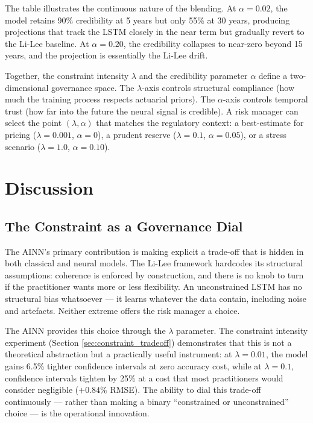 \documentclass[11pt,a4paper]{article}
\begin{document}
The table illustrates the continuous nature of the blending. At $\alpha = 0.02$, the model retains 90\% credibility at 5 years but only 55\% at 30 years, producing projections that track the LSTM closely in the near term but gradually revert to the Li-Lee baseline. At $\alpha = 0.20$, the credibility collapses to near-zero beyond 15 years, and the projection is essentially the Li-Lee drift.

Together, the constraint intensity $\lambda$ and the credibility parameter $\alpha$ define a two-dimensional governance space. The $\lambda$-axis controls structural compliance (how much the training process respects actuarial priors). The $\alpha$-axis controls temporal trust (how far into the future the neural signal is credible). A risk manager can select the point $(\lambda, \alpha)$ that matches the regulatory context: a best-estimate for pricing ($\lambda = 0.001$, $\alpha = 0$), a prudent reserve ($\lambda = 0.1$, $\alpha = 0.05$), or a stress scenario ($\lambda = 1.0$, $\alpha = 0.10$).




\section{Discussion}

\subsection{The Constraint as a Governance Dial}

The AINN's primary contribution is making explicit a trade-off that is hidden in both classical and neural models. The Li-Lee framework hardcodes its structural assumptions: coherence is enforced by construction, and there is no knob to turn if the practitioner wants more or less flexibility. An unconstrained LSTM has no structural bias whatsoever --- it learns whatever the data contain, including noise and artefacts. Neither extreme offers the risk manager a choice.

The AINN provides this choice through the $\lambda$ parameter. The constraint intensity experiment (Section \ref{sec:constraint_tradeoff}) demonstrates that this is not a theoretical abstraction but a practically useful instrument: at $\lambda = 0.01$, the model gains 6.5\% tighter confidence intervals at zero accuracy cost, while at $\lambda = 0.1$, confidence intervals tighten by 25\% at a cost that most practitioners would consider negligible ($+0.84\%$ RMSE). The ability to dial this trade-off continuously --- rather than making a binary ``constrained or unconstrained'' choice --- is the operational innovation.
\end{document}
